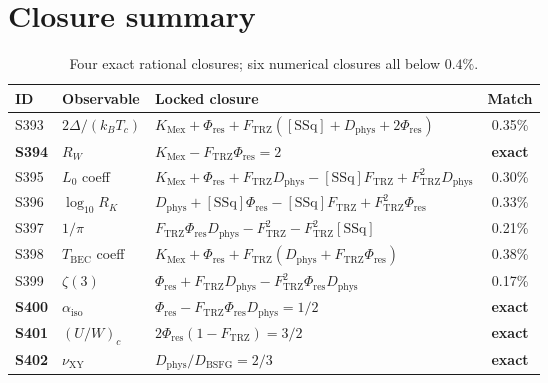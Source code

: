 \documentclass[11pt]{article}
\newcommand{\Ftrz}{F_{\mathrm{TRZ}}}
\newcommand{\Phires}{\Phi_{\mathrm{res}}}
\newcommand{\KMex}{K_{\mathrm{Mex}}}
\newcommand{\Dphys}{D_{\mathrm{phys}}}
\newcommand{\Dbsfg}{D_{\mathrm{BSFG}}}
\newcommand{\SSq}{[\mathrm{SSq}]}
\begin{document}
\section{Closure summary}
\begin{table}[h!]
\centering
\begin{tabular}{lllc}
\toprule
ID & Observable & Locked closure & Match \\
\midrule
S393 & $2\Delta/(k_{B}T_{c})$       & $\KMex+\Phires+\Ftrz(\SSq+\Dphys+2\Phires)$       & 0.35\% \\
\textbf{S394} & $R_{W}$                       & $\KMex-\Ftrz\Phires=2$                            & \textbf{exact} \\
S395 & $L_{0}$ coeff                  & $\KMex+\Phires+\Ftrz\Dphys-\SSq\Ftrz+\Ftrz^{2}\Dphys$ & 0.30\% \\
S396 & $\log_{10}R_{K}$               & $\Dphys+\SSq\Phires-\SSq\Ftrz+\Ftrz^{2}\Phires$    & 0.33\% \\
S397 & $1/\pi$                        & $\Ftrz\Phires\Dphys-\Ftrz^{2}-\Ftrz^{2}\SSq$       & 0.21\% \\
S398 & $T_{\text{BEC}}$ coeff         & $\KMex+\Phires+\Ftrz(\Dphys+\Ftrz\Phires)$         & 0.38\% \\
S399 & $\zeta(3)$                     & $\Phires+\Ftrz\Dphys-\Ftrz^{2}\Phires\Dphys$       & 0.17\% \\
\textbf{S400} & $\alpha_{\text{iso}}$         & $\Phires-\Ftrz\Phires\Dphys=1/2$                  & \textbf{exact} \\
\textbf{S401} & $(U/W)_{c}$                   & $2\Phires(1-\Ftrz)=3/2$                           & \textbf{exact} \\
\textbf{S402} & $\nu_{\text{XY}}$             & $\Dphys/\Dbsfg=2/3$                               & \textbf{exact} \\
\bottomrule
\end{tabular}
\caption{Four exact rational closures; six numerical closures all
below $0.4\%$.}
\end{table}
\end{document}
